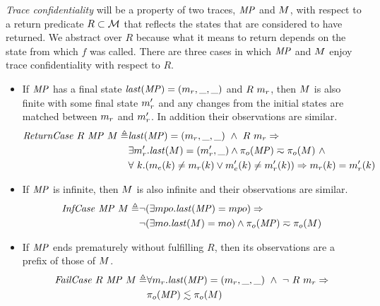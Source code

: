 \documentclass[acmsmall,review,anonymous]{acmart}\settopmatter{printfolios=true,printccs=false,printacmref=false}
\begin{document}
{

{\em Trace confidentiality} will be a property of two traces, \(\mathit{MP}\) and
\(M\), with respect to a return predicate \(R \subset {\mathcal M}\) that
reflects the states that are considered to have returned. We abstract over
\(R\) because what it means to return depends on the state from which
\(f\) was called. There are three cases in which \(\mathit{MP}\) and \(M\)
enjoy trace confidentiality with respect to \(R\).

\begin{itemize}
  \item If \(\mathit{MP}\) has a final state \(\mathit{last}(\mathit{MP}) = (m_r,\_,\_)\) and \(R\ m_r\), then \(M\) is also finite with
    some final state \(m_r'\) and any changes from the initial states are
    matched between \(m_r\) and \(m_r'\). In addition their
    observations are similar.
    \[\begin{split}
      \mathit{ReturnCase} ~ R ~ \mathit{MP} ~ M \triangleq &
      \mathit{last}(\mathit{MP}) =
        (m_r,\_,\_) ~ \land ~ R ~ m_r \Rightarrow \\
      & \exists m_r' . \mathit{last}(M) = (m_r',\_)
        \land \pi_o(\mathit{MP}) \eqsim \pi_o(M) ~ \land \\
      & \forall ~ k . (m_e(k) \not = m_r(k)
        \lor m_e'(k) \not = m_r'(k)) \Rightarrow
      m_r(k) = m_r'(k)
    \end{split}\]
  \item If \(\mathit{MP}\) is infinite, then \(M\) is also infinite and their
  observations are similar.
    \[\begin{split}
      \mathit{InfCase} ~ \mathit{MP} ~ M \triangleq
      & \neg (\exists mpo . \mathit{last}(\mathit{MP}) = mpo) \Rightarrow \\
      & \neg (\exists mo . \mathit{last}(M) = mo)
        \land \pi_o(\mathit{MP}) \eqsim \pi_o(M)
    \end{split}\]
\item If \(\mathit{MP}\) ends prematurely without fulfilling \(R\), then
  its observations are a prefix of those of \(M\).
    \[\begin{split}
      \mathit{FailCase} ~ R ~ \mathit{MP} ~ M \triangleq
      & \forall m_r .
        \mathit{last}(\mathit{MP}) = (m_r,\_,\_) ~ \land ~ \neg ~ R ~ m_r \Rightarrow \\
      & \pi_o(\mathit{MP}) \lesssim \pi_o(M)
    \end{split}\]
\end{itemize}

}
\end{document}
